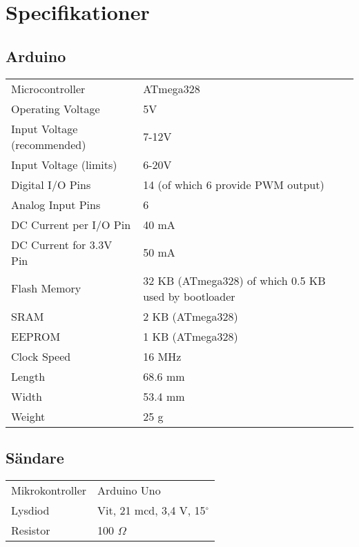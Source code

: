 \section{Specifikationer} %
\label{sec:specifikationer}

    \subsection{Arduino} %
    \label{sub:arduino_spec}
        \begin{tabularx}{\textwidth}{@{}lX}

            Microcontroller & ATmega328 \\
            Operating Voltage &  5V \\
            Input Voltage (recommended) & 7-12V \\
            Input Voltage (limits) & 6-20V \\
            Digital I/O Pins  &  14 (of which 6 provide PWM output) \\
            Analog Input Pins  & 6 \\
            DC Current per I/O Pin  & 40 mA \\
            DC Current for 3.3V Pin & 50 mA \\
            Flash Memory  &  32 KB (ATmega328) of which 0.5 KB used by bootloader \\
            SRAM  &  2 KB (ATmega328) \\
            EEPROM & 1 KB (ATmega328) \\
            Clock Speed & 16 MHz \\
            Length & 68.6 mm \\
            Width  & 53.4 mm \\
            Weight & 25 g     \\
        \end{tabularx}

    \subsection{Sändare} %
    \label{sub:sandare}
    \begin{tabularx}{\textwidth}{@{}lX}
        Mikrokontroller & Arduino Uno \\
        Lysdiod & Vit, 21\thinspace000 mcd, 3,4 V, 15$^{\circ}$ \\
        Resistor & 100 $\Omega$
        
    \end{tabularx}

